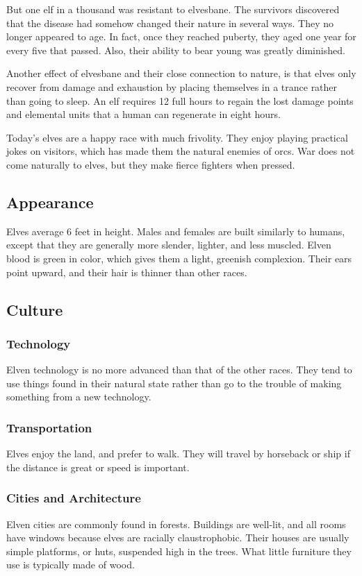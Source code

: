\begin{multicols*}{2}
But one elf in a thousand was resistant to elvesbane.
The survivors discovered that the disease had somehow changed their nature in several ways. They no longer appeared to age. In fact, once they reached puberty, they aged one year for every five that passed. Also, their ability to bear young was greatly diminished.

Another effect of elvesbane and their close connection to nature, is that elves only recover from damage and exhaustion by placing themselves in a trance rather than going to sleep. An elf requires 12 full hours to regain the lost damage points and elemental units that a human can regenerate in eight hours.

Today's elves are a happy race with much frivolity. They enjoy playing practical jokes on visitors, which has made them the natural enemies of orcs. War does not come naturally to elves, but they make fierce fighters when pressed.
\subsection{Appearance}
Elves average 6 feet in height. Males and females are built similarly to humans, except that they are generally more slender, lighter, and less muscled. Elven blood is green in color, which gives them a light, greenish complexion. Their ears point upward, and their hair is thinner than other races.
\subsection{Culture}
\subsubsection{Technology}
Elven technology is no more advanced than that of the other races. They tend to use things found in their natural state rather than go to the trouble of making something from a
new technology.
\subsubsection{Transportation}
Elves enjoy the land, and prefer to walk. They will travel by horseback or ship if the distance is great or speed is important.
\subsubsection{Cities and Architecture}
Elven cities are commonly found in forests. Buildings are well-lit, and all rooms have windows because elves are racially claustrophobic. Their houses are usually simple platforms, or huts, suspended high in the trees. What little furniture they use is typically made of wood.

\end{multicols*}
